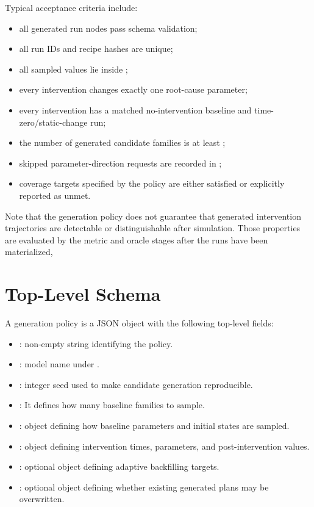 \documentclass[11pt]{article}
\begin{document}
Typical acceptance criteria include:
\begin{itemize}
    \item all generated run nodes pass schema validation;
    \item all run IDs and recipe hashes are unique;
    \item all sampled values lie inside ;
    \item every intervention changes exactly one root-cause parameter;
    \item every intervention has a matched no-intervention baseline and time-zero/static-change run;
    \item the number of generated candidate families is at least ;
    \item skipped parameter-direction requests are recorded in ;
    \item coverage targets specified by the policy are either satisfied or explicitly reported as unmet.
\end{itemize}

Note that the generation policy does not guarantee that generated intervention trajectories are detectable or distinguishable after simulation.
Those properties are evaluated by the metric and oracle stages after the runs have been materialized,

\section*{Top-Level Schema}

A generation policy is a JSON object with the following top-level fields:

\begin{itemize}
    \item {}: non-empty string identifying the policy.
    \item {}: model name under .
    \item {}: integer seed used to make candidate generation reproducible.
    \item {}: It defines how many baseline families to sample.
    \item {}: object defining how baseline parameters and initial states are sampled.
    \item {}: object defining intervention times, parameters, and post-intervention values.
    \item {}: optional object defining adaptive backfilling targets.
    \item {}: optional object defining whether existing generated plans may be overwritten.
\end{itemize}
\end{document}
